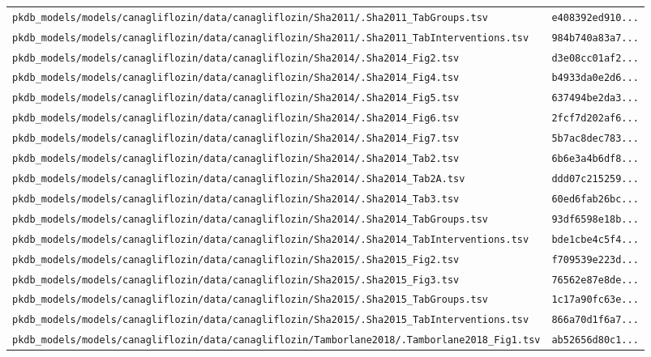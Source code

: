 \documentclass{article}
\begin{document}
\begin{longtable}{ll}
\texttt{pkdb\_models/models/canagliflozin/data/canagliflozin/Sha2011/.Sha2011\_TabGroups.tsv} & \texttt{e408392ed910...} \\
\texttt{pkdb\_models/models/canagliflozin/data/canagliflozin/Sha2011/.Sha2011\_TabInterventions.tsv} & \texttt{984b740a83a7...} \\
\texttt{pkdb\_models/models/canagliflozin/data/canagliflozin/Sha2014/.Sha2014\_Fig2.tsv} & \texttt{d3e08cc01af2...} \\
\texttt{pkdb\_models/models/canagliflozin/data/canagliflozin/Sha2014/.Sha2014\_Fig4.tsv} & \texttt{b4933da0e2d6...} \\
\texttt{pkdb\_models/models/canagliflozin/data/canagliflozin/Sha2014/.Sha2014\_Fig5.tsv} & \texttt{637494be2da3...} \\
\texttt{pkdb\_models/models/canagliflozin/data/canagliflozin/Sha2014/.Sha2014\_Fig6.tsv} & \texttt{2fcf7d202af6...} \\
\texttt{pkdb\_models/models/canagliflozin/data/canagliflozin/Sha2014/.Sha2014\_Fig7.tsv} & \texttt{5b7ac8dec783...} \\
\texttt{pkdb\_models/models/canagliflozin/data/canagliflozin/Sha2014/.Sha2014\_Tab2.tsv} & \texttt{6b6e3a4b6df8...} \\
\texttt{pkdb\_models/models/canagliflozin/data/canagliflozin/Sha2014/.Sha2014\_Tab2A.tsv} & \texttt{ddd07c215259...} \\
\texttt{pkdb\_models/models/canagliflozin/data/canagliflozin/Sha2014/.Sha2014\_Tab3.tsv} & \texttt{60ed6fab26bc...} \\
\texttt{pkdb\_models/models/canagliflozin/data/canagliflozin/Sha2014/.Sha2014\_TabGroups.tsv} & \texttt{93df6598e18b...} \\
\texttt{pkdb\_models/models/canagliflozin/data/canagliflozin/Sha2014/.Sha2014\_TabInterventions.tsv} & \texttt{bde1cbe4c5f4...} \\
\texttt{pkdb\_models/models/canagliflozin/data/canagliflozin/Sha2015/.Sha2015\_Fig2.tsv} & \texttt{f709539e223d...} \\
\texttt{pkdb\_models/models/canagliflozin/data/canagliflozin/Sha2015/.Sha2015\_Fig3.tsv} & \texttt{76562e87e8de...} \\
\texttt{pkdb\_models/models/canagliflozin/data/canagliflozin/Sha2015/.Sha2015\_TabGroups.tsv} & \texttt{1c17a90fc63e...} \\
\texttt{pkdb\_models/models/canagliflozin/data/canagliflozin/Sha2015/.Sha2015\_TabInterventions.tsv} & \texttt{866a70d1f6a7...} \\
\texttt{pkdb\_models/models/canagliflozin/data/canagliflozin/Tamborlane2018/.Tamborlane2018\_Fig1.tsv} & \texttt{ab52656d80c1...} \\

\end{longtable}
\end{document}
